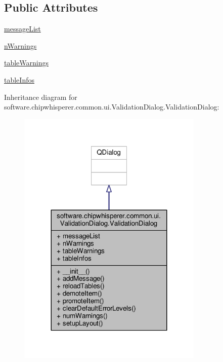 \subsection*{Public Attributes}
\begin{DoxyCompactItemize}
\item 
\hyperlink{classsoftware_1_1chipwhisperer_1_1common_1_1ui_1_1ValidationDialog_1_1ValidationDialog_a03a682a5279012b6da17739a6f62ff42}{message\+List}
\item 
\hyperlink{classsoftware_1_1chipwhisperer_1_1common_1_1ui_1_1ValidationDialog_1_1ValidationDialog_aa66403c4b375c4e56a8220c4a750be20}{n\+Warnings}
\item 
\hyperlink{classsoftware_1_1chipwhisperer_1_1common_1_1ui_1_1ValidationDialog_1_1ValidationDialog_a3f6ce8711d336349a1969276ba025951}{table\+Warnings}
\item 
\hyperlink{classsoftware_1_1chipwhisperer_1_1common_1_1ui_1_1ValidationDialog_1_1ValidationDialog_a1b95a93215b90d97b977c59cbb371856}{table\+Infos}
\end{DoxyCompactItemize}


Inheritance diagram for software.\+chipwhisperer.\+common.\+ui.\+Validation\+Dialog.\+Validation\+Dialog\+:\nopagebreak
\begin{figure}[H]
\begin{center}
\leavevmode
\includegraphics[width=251pt]{de/db0/classsoftware_1_1chipwhisperer_1_1common_1_1ui_1_1ValidationDialog_1_1ValidationDialog__inherit__graph}
\end{center}
\end{figure}


